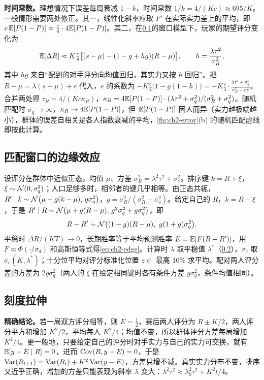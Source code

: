\textbf{时间常数。}理想情况下误差每局衰减 $1-k$，时间常数 $1/k=4/(Kc)\approx695/K$。一般情形需要两处修正。其一，线性化斜率应取 $F'$ 在实际实力差上的平均，即 $c\,\mathbb{E}[P(1-P)]=\tfrac c4\cdot4\mathbb{E}[P(1-P)]$。其二，在\cref{app:ch2-edge}的窗口模型下，玩家的期望评分变化为
\[
  \mathbb{E}[\Delta R]\approx K\tfrac c4\bigl[(s-\mu)-(1-g+hg)(R-\mu)\bigr],\qquad h=\frac{\lambda\tau^2}{\sigma_R^2},
\]
其中 $hg$ 来自“配到的对手评分向均值回归，其实力又按 $h$ 回归”。把 $R-\mu=\lambda(s-\mu)+e$ 代入，$e$ 的系数为 $-K\tfrac c4\bigl(1-g(1-h)\bigr)=-K\tfrac c4\cdot\frac{\lambda\tau^2+\sigma_q^2}{\sigma_R^2+\sigma_q^2}$。合并两处得 $\tau_R=4/(Kc\kappa_R)$，$\kappa_R=4\mathbb{E}[P(1-P)]\cdot(\lambda\tau^2+\sigma_q^2)/(\sigma_R^2+\sigma_q^2)$。随机匹配时 $\sigma_q\to\infty$，$\kappa_R\to4\mathbb{E}[P(1-P)]$，但 $\mathbb{E}[P(1-P)]$ 因人而异（实力越极端越小），群体的误差自相关是各人指数衰减的平均，\cref{fig:ch2-error}(b) 的随机匹配虚线即按此计算。

\subsection{匹配窗口的边缘效应}
\label{app:ch2-edge}

设评分在群体中近似正态，均值 $\mu$、方差 $\sigma_R^2=\lambda^2\tau^2+\sigma_e^2$。排序键 $k=R+\xi$，$\xi\sim\mathcal{N}(0,\sigma_q^2)$；人口足够多时，相邻者的键几乎相等。由正态共轭，$R'\mid k\sim\mathcal{N}\bigl(\mu+g(k-\mu),\,g\sigma_q^2\bigr)$，$g=\sigma_R^2/(\sigma_R^2+\sigma_q^2)$。给定自己的 $R$，$k=R+\xi$，于是 $R'\mid R\sim\mathcal{N}\bigl(\mu+g(R-\mu),\,g^2\sigma_q^2+g\sigma_q^2\bigr)$，即
\[
  R-R'\sim\Normal\bigl((1-g)(R-\mu),\ g(1+g)\sigma_q^2\bigr).
\]
平稳时 $\Delta R/(KT)\to0$，长期胜率等于平均预测胜率 $\bar E=\mathbb{E}[F(R-R')]$，用 $F\approx\Phi(\cdot/\sigma_d)$ 和高斯恒等式得\cref{eq:ch2-edge}。计算时 $\lambda$ 取平稳值 $\lambda^*$（\cref{app:ch2-stretch}），$\sigma_e$ 取 $\sigma_e(K,\lambda^*)$；十分位平均对评分标准化位置 $z\in$ 最高 10\% 求平均。配对两人评分差的方差为 $2g\sigma_q^2$（两人的 $\xi$ 在给定相同键时各有条件方差 $g\sigma_q^2$，条件均值相同）。

\subsection{刻度拉伸}
\label{app:ch2-stretch}

\textbf{精确结论。}若一局双方评分相等，则 $E=\tfrac12$，赛后两人评分为 $R\pm K/2$，两人评分平方和增加 $K^2/2$，平均每人 $K^2/4$；均值不变，所以群体评分方差每局增加 $K^2/4$。更一般地，只要给定自己的评分时对手实力与自己的实力可交换，就有 $\mathbb{E}[y-E\mid R]=0$，进而 $\operatorname{Cov}(R,y-E)=0$，于是 $\operatorname{Var}(R_{t+1})=\operatorname{Var}(R_t)+K^2\operatorname{Var}(y-E)$，方差只增不减。真实实力分布不变，排序又近乎正确，增加的方差只能表现为斜率 $\lambda$ 变大：$\lambda^2\tau^2\approx\lambda_0^2\tau^2+K^2t/4$。


